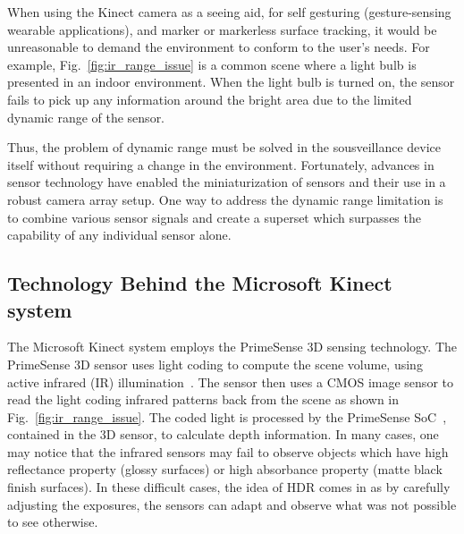 When using the Kinect camera as a seeing aid, for self gesturing (gesture-sensing wearable applications), and marker or markerless surface tracking, it would be unreasonable to demand the environment to conform to the user's needs. For example, Fig.~\ref{fig:ir_range_issue} is a common scene where a light bulb is presented in an indoor environment. When the light bulb is turned on, the sensor fails to pick up any information around the bright area due to the limited dynamic range of the sensor. 

Thus, the problem of dynamic range must be solved in the sousveillance device itself without requiring a  change in the environment. Fortunately, advances in sensor technology have enabled the miniaturization of sensors and their use in a robust camera array setup. One way to address the dynamic range limitation is to combine various sensor signals and create a superset which surpasses the capability of any individual sensor alone.

\subsection{Technology Behind the Microsoft Kinect system}
The Microsoft Kinect system employs the PrimeSense 3D sensing technology. The PrimeSense 3D sensor uses light coding to compute the scene volume, using active infrared (IR) illumination~\cite{shpunt2008depth,shpunt2010optical,shpunt2007depth}. The sensor then uses a CMOS image sensor to read the light coding infrared patterns back from the scene as shown in Fig.~\ref{fig:ir_range_issue}. The coded light is processed by the PrimeSense SoC~\cite{spektor2009integrated}, contained in the 3D sensor, to calculate depth information. In many cases, one may notice that the infrared sensors may fail to observe objects which have high reflectance property (glossy surfaces) or high absorbance property (matte black finish surfaces). In these difficult cases, the idea of HDR comes in as by carefully adjusting the exposures, the sensors can adapt and observe what was not possible to see otherwise.

